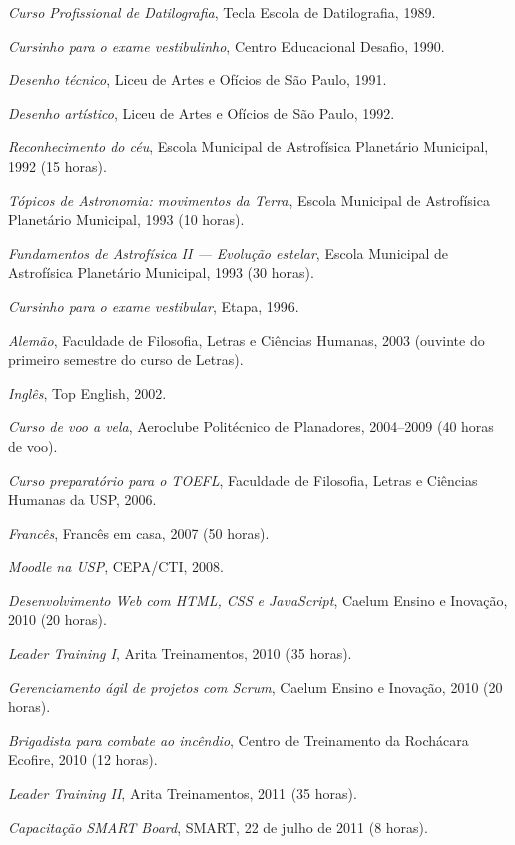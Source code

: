 \begin{compactitem}
	\item \textsl{Curso Profissional de Datilografia}, Tecla Escola de Datilografia, 1989.
	\item \textsl{Cursinho para o exame vestibulinho}, Centro Educacional Desafio, 1990.
	\item \textsl{Desenho técnico}, Liceu de Artes e Ofícios de São Paulo, 1991.
	\item \textsl{Desenho artístico}, Liceu de Artes e Ofícios de São Paulo, 1992.
	\item \textsl{Reconhecimento do céu}, Escola Municipal de Astrofísica Planetário Municipal, 1992 (15 horas).
	\item \textsl{Tópicos de Astronomia: movimentos da Terra}, Escola Municipal de Astrofísica Planetário Municipal, 1993 (10 horas).
	\item \textsl{Fundamentos de Astrofísica II --- Evolução estelar}, Escola Municipal de Astrofísica Planetário Municipal, 1993 (30 horas).
	\item \textsl{Cursinho para o exame vestibular}, Etapa, 1996.
	\item \textsl{Alemão}, Faculdade de Filosofia, Letras e Ciências Humanas, 2003 (ouvinte do primeiro semestre do curso de Letras).
	\item \textsl{Inglês}, Top English, 2002.
	\item \textsl{Curso de voo a vela}, Aeroclube Politécnico de Planadores, 2004--2009 (40 horas de voo).
	\item \textsl{Curso preparatório para o TOEFL}, Faculdade de Filosofia, Letras e Ciências Humanas da USP, 2006.
	\item \textsl{Francês}, Francês em casa, 2007 (50 horas).
	\item \textsl{Moodle na USP}, CEPA/CTI, 2008.
	\item \textsl{Desenvolvimento Web com HTML, CSS e JavaScript}, Caelum Ensino e Inovação, 2010 (20 horas).
	\item \textsl{Leader Training I}, Arita Treinamentos, 2010 (35 horas).
	\item \textsl{Gerenciamento ágil de projetos com Scrum}, Caelum Ensino e Inovação, 2010 (20 horas).
	\item \textsl{Brigadista para combate ao incêndio}, Centro de Treinamento da Rochácara Ecofire, 2010 (12 horas).
	\item \textsl{Leader Training II}, Arita Treinamentos, 2011 (35 horas).
	\item \textsl{Capacitação SMART Board}, SMART, 22 de julho de 2011 (8 horas).
\end{compactitem}


